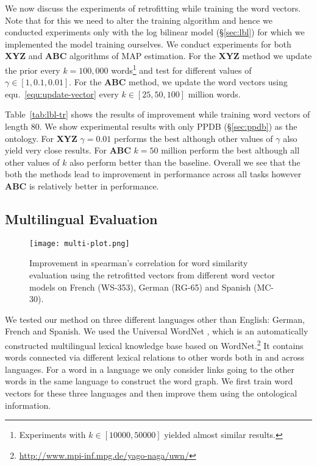 \documentclass[11pt]{article}
\begin{document}
We now discuss the experiments of retrofitting while training the word vectors. Note that
for this we need to alter the training algorithm and hence we conducted experiments only
with the log bilinear model (\S\ref{sec:lbl}) for which we implemented the model training ourselves.
We conduct experiments for both \textbf{XYZ} and \textbf{ABC} algorithms of
MAP estimation. For the \textbf{XYZ} method
we update the prior every $k=100,000$ words\footnote{Experiments with $k \in [10000, 50000]$ 
yielded almost similar results.} and test for different values of $\gamma \in [1, 0.1, 0.01]$.
For the \textbf{ABC} method, we update the word vectors using equ.~\ref{equ:update-vector}
every $k \in [25, 50, 100]$ million words. 

Table~\ref{tab:lbl-tr} shows the results of improvement while training word vectors of length $80$. 
We show experimental results 
with only PPDB (\S\ref{sec:ppdb}) as the ontology. For \textbf{XYZ}
$\gamma = 0.01$ performs the best although other values of $\gamma$ also yield very close 
results. For \textbf{ABC} $k=50$ million perform the best although all other values of $k$
also perform better than the baseline. Overall we see that the both the methods lead to 
improvement in performance across all tasks however \textbf{ABC} is relatively better in
performance.

\subsection{Multilingual Evaluation}
\label{sec:multilingual}

\begin{figure}[!tb]
  \centering
  \texttt{[image: multi-plot.png]}
  \caption{Improvement in spearman's correlation for word similarity evaluation using the
  retrofitted vectors from different word vector models on French (WS-353), German (RG-65)
  and Spanish (MC-30).}
  \label{fig:multi-lang}
\end{figure}

We tested our method on three different languages other than English: German,
French and Spanish. We used the Universal WordNet \cite{deMeloWeikum2009}, which 
is an automatically constructed multilingual lexical knowledge base based on 
WordNet.\footnote{\url{http://www.mpi-inf.mpg.de/yago-naga/uwn/}} 
It contains words connected via different lexical relations to other words both
in and across languages. For a word in a language we only consider links going to
the other words in the same language to construct the word graph. We first train
word vectors for these three languages and then improve them using the ontological
information.
\end{document}
